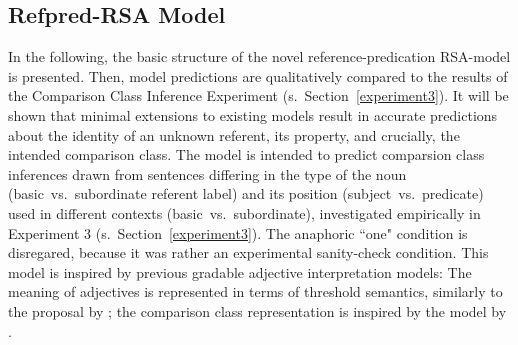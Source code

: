 \subsection{Refpred-RSA Model}
\label{refpred-rsa}
In the following, the basic structure of the novel reference-predication RSA-model is presented. %
Then, model predictions are qualitatively compared to the results of the Comparison Class Inference Experiment (s.~Section~\ref{experiment3}). It will be shown that minimal extensions to existing models result in accurate predictions about the identity of an unknown referent, its property, and crucially, the intended comparison class. 
The model is intended to predict comparsion class inferences drawn from sentences differing in the type of the noun (basic~vs.~subordinate referent label) and its position (subject~vs.~predicate) used in different contexts (basic~vs.~subordinate), investigated empirically in Experiment 3 (s.~Section~\ref{experiment3}). The anaphoric ``one" condition is disregared, because it was rather an experimental sanity-check condition. This model is inspired by previous gradable adjective interpretation models: The meaning of adjectives is represented in terms of threshold semantics, similarly to the proposal by \textcite{lassiter2013context}; the comparison class representation is inspired by the model by \textcite{tessler2017warm}.

